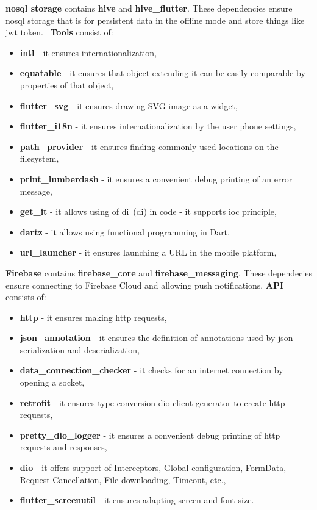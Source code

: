 \textbf{\acrshort{nosql} storage} contains \textbf{hive} and \textbf{hive\_flutter}.
These dependencies ensure \acrshort{nosql} storage that is for persistent data in the offline mode and store things like \acrshort{jwt} token.~\cite{jwtToken}
\newline
\newline
\textbf{Tools} consist of:
\begin{itemize}
    \item \textbf{intl} - it ensures internationalization,
    \item \textbf{equatable} - it ensures that object extending it can be easily comparable by properties of that object,
    \item \textbf{flutter\_svg} - it ensures drawing SVG image as a widget,
    \item \textbf{flutter\_i18n} - it ensures internationalization by the user phone settings,
    \item \textbf{path\_provider} - it ensures finding commonly used locations on the filesystem,
    \item \textbf{print\_lumberdash} - it ensures a convenient debug printing of an error message,
    \item \textbf{get\_it} - it allows using of \acrshort{di}~(\acrlong{di}) in code - it supports \acrshort{ioc} principle,~\cite{iocPrinciple}
    \item \textbf{dartz} - it allows using functional programming in Dart,
    \item \textbf{url\_launcher} - it ensures launching a URL in the mobile platform,
\end{itemize}
\textbf{Firebase} contains \textbf{firebase\_core} and \textbf{firebase\_messaging}.
These dependecies ensure connecting to Firebase Cloud and allowing push notifications.
\newline
\textbf{API} consists of:
\begin{itemize}
    \item \textbf{http} - it ensures making \acrshort{http} requests,
    \item \textbf{json\_annotation} - it ensures the definition of annotations used by \acrshort{json} serialization and deserialization,
    \item \textbf{data\_connection\_checker} - it checks for an internet connection by opening a socket,
    \item \textbf{retrofit} - it ensures type conversion dio client generator to create \acrshort{http} requests,
    \item \textbf{pretty\_dio\_logger} - it ensures a convenient debug printing of \acrshort{http} requests and responses,
    \item \textbf{dio} - it offers support of Interceptors, Global configuration, FormData, Request Cancellation, File downloading, Timeout, etc.,
    \item \textbf{flutter\_screenutil} - it ensures adapting screen and font size.
\end{itemize}
